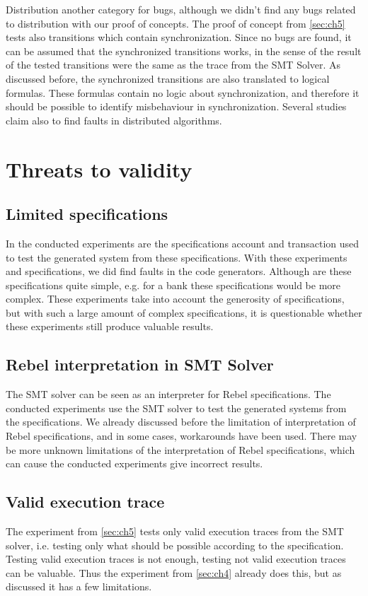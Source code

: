 Distribution another category for bugs, although we didn't find any bugs related to distribution with our proof of concepts. The proof of concept from \autoref{sec:ch5} tests also transitions which contain synchronization. Since no bugs are found, it can be assumed that the synchronized transitions works, in the sense of the result of the tested transitions were the same as the trace from the SMT Solver. As discussed before, the synchronized transitions are also translated to logical formulas. These formulas contain no logic about synchronization, and therefore it should be possible to identify misbehaviour in synchronization. Several studies claim also to find faults in distributed algorithms.


\section{Threats to validity}

\subsection*{Limited specifications}
In the conducted experiments are the specifications account and transaction used to test the generated system from these specifications. With these experiments and specifications, we did find faults in the code generators. Although are these specifications quite simple, e.g. for a bank these specifications would be more complex. These experiments take into account the generosity of specifications, but with such a large amount of complex specifications, it is questionable whether these experiments still produce valuable results.

\subsection*{Rebel interpretation in SMT Solver}
The SMT solver can be seen as an interpreter for Rebel specifications. The conducted experiments use the SMT solver to test the generated systems from the specifications. We already discussed before the limitation of interpretation of Rebel specifications, and in some cases, workarounds have been used. There may be more unknown limitations of the interpretation of Rebel specifications, which can cause the conducted experiments give incorrect results.

\subsection*{Valid execution trace}
The experiment from \autoref{sec:ch5} tests only valid execution traces from the SMT solver, i.e. testing only what should be possible according to the specification. Testing valid execution traces is not enough, testing not valid execution traces can be valuable. Thus the experiment from \autoref{sec:ch4} already does this, but as discussed it has a few limitations.
